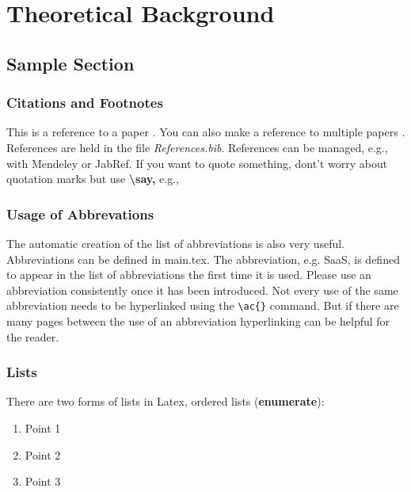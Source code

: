 
\chapter{Theoretical Background}
\label{chap:background}

\section{Sample Section}

\subsection{Citations and Footnotes}

This is a reference to a paper \citep{Pernul1994}. You can also make a reference to multiple papers \citep{Pernul1994, pernul2009datenbanken}. References are held in the file \textit{References.bib}. References can be managed, e.g., with Mendeley or JabRef. If you want to quote something, dont't worry about quotation marks but use 
\textbf{\textbackslash say,} e.g.,  \par\smallskip

\subsection{Usage of Abbrevations}

The automatic creation of the list of abbreviations is also very useful. Abbreviations can be defined in main.tex. The abbreviation, e.g. \ac{SaaS}, is defined to appear in the list of abbreviations the first time it is used. Please use an abbreviation consistently once it has been introduced.
Not every use of the same abbreviation needs to be hyperlinked using the \verb+\ac{}+ command. But if there are many pages between the use of an abbreviation hyperlinking can be helpful for the reader.


\subsection{Lists}
There are two forms of lists in Latex, ordered lists (\textbf{enumerate}):
\begin{enumerate}
    \item Point 1
    \item Point 2
    \item Point 3
\end{enumerate}

